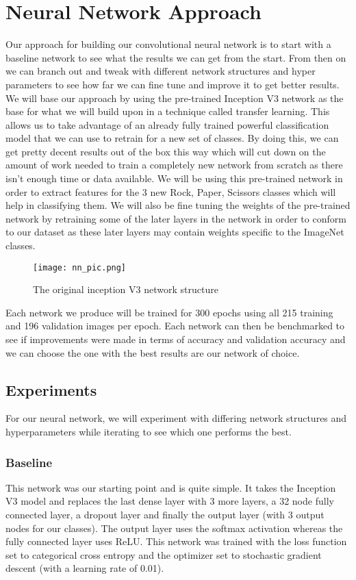 \section{Neural Network Approach}
\label{neural_network}
Our approach for building our convolutional neural network is to start with a baseline network to see what the results we can get from the start. From then on we can branch out and tweak with different network structures and hyper parameters to see how far we can fine tune and improve it to get better results.
We will base our approach by using the pre-trained Inception V3 network as the base for what we will build upon in a technique called transfer learning. This allows us to take advantage of an already fully trained powerful classification model that we can use to retrain for a new set of classes. By doing this, we can get pretty decent results out of the box this way which will cut down on the amount of work needed to train a completely new network from scratch as there isn’t enough time or data available. We will be using this pre-trained network in order to extract features for the 3 new Rock, Paper, Scissors classes which will help in classifying them. We will also be fine tuning the weights of the pre-trained network by retraining some of the later layers in the network in order to conform to our dataset as these later layers may contain weights specific to the ImageNet classes.

\begin{figure}[h]
\texttt{[image: nn\_pic.png]}
\centering
\caption{The original inception V3 network structure}
\end{figure}

Each network we produce will be trained for 300 epochs using all 215 training and 196 validation images per epoch. Each network can then be benchmarked to see if improvements were made in terms of accuracy and validation accuracy and we can choose the one with the best results are our network of choice.
\subsection{Experiments}

For our neural network, we will experiment with differing network structures and hyperparameters while iterating to see which one performs the best.
\subsubsection{Baseline}
This network was our starting point and is quite simple. It takes the Inception V3 model and replaces the last dense layer with 3 more layers, a 32 node fully connected layer, a dropout layer and finally the output layer (with 3 output nodes for our classes). The output layer uses the softmax activation whereas the fully connected layer uses ReLU. This network was trained with the loss function set to categorical cross entropy and the optimizer set to stochastic gradient descent (with a learning rate of 0.01).

